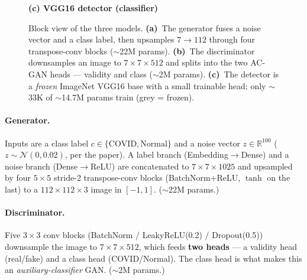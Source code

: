 \documentclass[11pt]{article}
\begin{document}
\begin{figure}[htbp]
\textbf{(c) VGG16 detector (classifier)}\\[2pt]
\caption{Block view of the three models. \textbf{(a)}~The generator fuses a noise
vector and a class label, then upsamples $7{\to}112$ through four transpose-conv
blocks ($\sim$22M params). \textbf{(b)}~The discriminator downsamples an image to
$7{\times}7{\times}512$ and splits into the two AC-GAN heads --- validity and class
($\sim$2M params). \textbf{(c)}~The detector is a \emph{frozen} ImageNet VGG16 base
with a small trainable head; only $\sim$33K of $\sim$14.7M params train (grey =
frozen).}
\label{fig:arch}
\end{figure}

\paragraph{Generator.} Inputs are a class label $c \in \{\text{COVID},
\text{Normal}\}$ and a noise vector $z \in \mathbb{R}^{100}$ ($z \sim
\mathcal{N}(0,0.02)$, per the paper). A label branch (Embedding$\to$Dense) and a
noise branch (Dense$\to$ReLU) are concatenated to $7{\times}7{\times}1025$ and
upsampled by four $5{\times}5$ stride-2 transpose-conv blocks (BatchNorm+ReLU,
$\tanh$ on the last) to a $112{\times}112{\times}3$ image in $[-1,1]$. ($\sim$22M
params.)

\paragraph{Discriminator.} Five $3{\times}3$ conv blocks (BatchNorm /
LeakyReLU(0.2) / Dropout(0.5)) downsample the image to $7{\times}7{\times}512$,
which feeds \textbf{two heads} --- a validity head (real/fake) and a class head
(COVID/Normal). The class head is what makes this an \emph{auxiliary-classifier}
GAN. ($\sim$2M params.)
\end{document}

